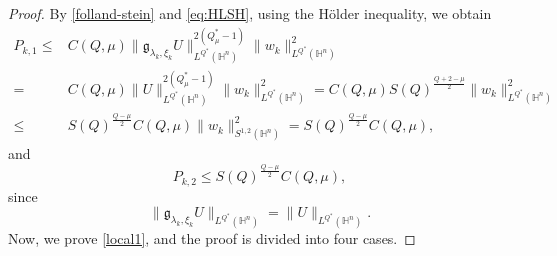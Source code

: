 \documentclass[11pt]{article}
\begin{document}
\begin{proof}
By \eqref{folland-stein} and \eqref{eq:HLSH}, using the %
 H\"{o}lder inequality, %
we obtain
\begin{align}\label{local4}
  P_{k,1}\leq & C(Q,\mu)\|\mathfrak{g}_{\lambda_k,\xi_k}U\|_{L^{Q^*}(\mathbb{H}^{n})}^{2(Q_\mu^*-1)}\|w_k\|_{L^{Q^*}(\mathbb{H}^{n})}^{2}
 \nonumber \\=&C(Q,\mu)\|U\|_{L^{Q^*}(\mathbb{H}^{n})}^{2(Q_\mu^*-1)}\|w_k\|_{L^{Q^*}(\mathbb{H}^{n})}^{2}
=C(Q,\mu)S(Q)^{\frac{Q+2-\mu}{2}} \|w_k\|_{L^{Q^*}(\mathbb{H}^{n})}^{2} \nonumber\\
\leq& S(Q)^{\frac{Q-\mu}{2}}C(Q,\mu)\|w_k\|^2_{S^{1,2}(\mathbb{H}^{n})}
=S(Q)^{\frac{Q-\mu}{2}}C(Q,\mu),
\end{align}
and
\begin{equation*}
  P_{k,2}\leq  S(Q)^{\frac{Q-\mu}{2}}C(Q,\mu),
\end{equation*}
since
    \begin{equation*}
      \|\mathfrak{g}_{\lambda_k,\xi_k}U\|_{L^{Q^*}(\mathbb{H}^{n})}=\|U\|_{L^{Q^*}(\mathbb{H}^{n})}.
    \end{equation*}
    Now, we prove \eqref{local1}, and the proof is divided into four cases.


\end{proof}
\end{document}
